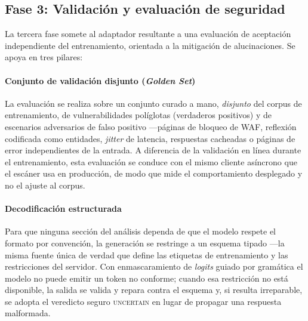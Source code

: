 \subsection{Fase 3: Validación y evaluación de seguridad}
\label{sec:ia-validacion}

La tercera fase somete al adaptador resultante a una evaluación de aceptación
independiente del entrenamiento, orientada a la mitigación de alucinaciones. Se
apoya en tres pilares:

\paragraph{Conjunto de validación disjunto (\emph{Golden Set})}
La evaluación se realiza sobre un conjunto curado a mano, \emph{disjunto} del
corpus de entrenamiento, de vulnerabilidades políglotas (verdaderos positivos)
y de escenarios adversarios de falso positivo ---páginas de bloqueo de WAF,
reflexión codificada como entidades, \emph{jitter} de latencia, respuestas
cacheadas o páginas de error independientes de la entrada. A diferencia de la
validación en línea durante el entrenamiento, esta evaluación se conduce con el
mismo cliente asíncrono que el escáner usa en producción, de modo que mide el
comportamiento desplegado y no el ajuste al corpus.

\paragraph{Decodificación estructurada}
Para que ninguna sección del análisis dependa de que el modelo respete el
formato por convención, la generación se restringe a un esquema tipado ---la
misma fuente única de verdad que define las etiquetas de entrenamiento y las
restricciones del servidor. Con enmascaramiento de \emph{logits} guiado por
gramática el modelo no puede emitir un token no conforme; cuando esa
restricción no está disponible, la salida se valida y repara contra el esquema
y, si resulta irreparable, se adopta el veredicto seguro \textsc{uncertain} en
lugar de propagar una respuesta malformada.

